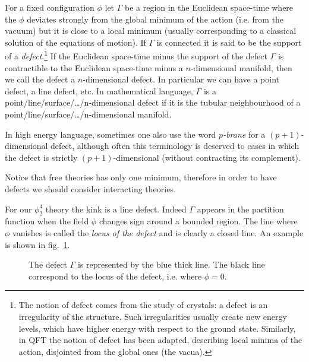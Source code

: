 \documentclass[../main/main.tex]{subfiles}
\begin{document}
For a fixed configuration $\phi$ let $\Gamma$ be a region in the Euclidean space-time where the $\phi$ deviates strongly from the global minimum of the action (i.e. from the vacuum) but it is close to a local minimum (usually corresponding to a classical solution of the equations of motion). 
If $\Gamma$ is connected it is said to be the support of a \emph{defect}.\footnote{The notion of defect comes from the study of crystals: a defect is an irregularity of the structure. Such irregularities usually create new energy levels, which have higher energy with respect to the ground state. Similarly, in QFT the notion of defect has been adapted, describing local minima of the action, disjointed from the global ones (the vacua).} 
If the Euclidean space-time minus the support of the defect $\Gamma$ is contractible to the Euclidean space-time minus a $n$-dimensional manifold, then we call the defect a $n$-dimensional defect. In particular we can have a point defect, a line defect, etc. In mathematical language, $\Gamma$ is a point/line/surface/\ldots/n-dimensional defect if it is the tubular neighbourhood of a point/line/surface/\ldots/n-dimensional manifold. 

In high energy language, sometimes one also use the word \emph{$p$-brane} for a $(p+1)$-dimensional defect, although often this terminology is deserved to cases in which the defect is strictly $(p+1)$-dimensional (without contracting its complement). 

Notice that free theories has only one minimum, therefore in order to have defects we should consider interacting theories.

\skipline

For our $\phi_2^4$ theory the kink is a line defect. Indeed $\Gamma$ appears in the partition function when the field $\phi$ changes sign around a bounded region. The line where $\phi$ vanishes is called the \emph{locus of the defect} and is clearly a closed line. An example is shown in fig.~\ref{fig:defect}. 

\begin{figure}[h]
\centering
{}
\caption{The defect $\Gamma$ is represented by the blue thick line. The black line correspond to the locus of the defect, i.e. where $\phi=0$.}
\label{fig:defect}
\end{figure}
\end{document}
